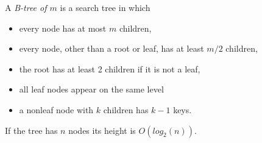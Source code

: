 \documentclass[12pt]{article}
\begin{document}
A \emph{B-tree of  $m$} is a  search tree in 
which 
\begin{itemize}
\item
every node has at most $m$ children,
\item 
every node, other than a root or leaf, has at least $m/2$ children,
\item
the root has at least 2 children if it is not a leaf,
\item
all leaf nodes appear on the same level
\item
a nonleaf node with $k$ children has $k-1$ keys.
\end{itemize}


If the tree has $n$ nodes its height is $O(log_2(n))$.

\end{document}
